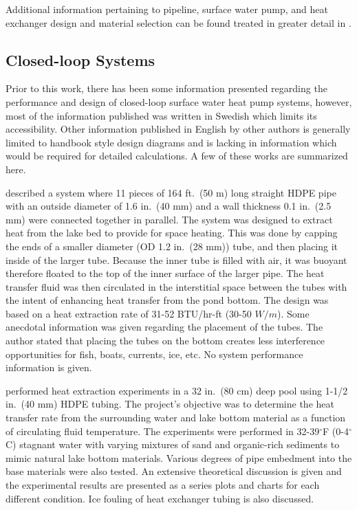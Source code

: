 Additional information pertaining to pipeline, surface water pump, and heat exchanger design and material selection can be found treated in greater detail in  \cite{MitchellSpitler2013}.

	\subsection{Closed-loop Systems}
	\label{subsec:Intro:LitRev:ClosedLoop}
	
Prior to this work, there has been some information presented regarding the performance and design of closed-loop surface water heat pump systems, however, most of the information published was written in Swedish which limits its accessibility. Other information published in English by other authors is generally limited to handbook style design diagrams and is lacking in information which would be required for detailed calculations. A few of these works are summarized here. 
	
\cite{Backlund1982} described a system where 11 pieces of 164 ft.\ (50 m) long straight HDPE pipe with  an outside diameter of 1.6 in.\ (40 mm) and a wall thickness 0.1 in.\ (2.5 mm) were connected together in parallel. The system was designed to extract heat from the lake bed to provide for space heating. This was done by capping the ends of a smaller diameter (OD 1.2 in.\ (28 mm)) tube, and then placing it inside of the larger tube. Because the inner tube is filled with air, it was buoyant therefore floated to the top of the inner surface of the larger pipe. The heat transfer fluid was then circulated in the interstitial space between the tubes with the intent of enhancing heat transfer from the pond bottom. The design was based on a heat extraction rate of 31-52 BTU/hr-ft (30-50 $W/m$). Some anecdotal information was given regarding the placement of the tubes. The author stated that placing the tubes on the bottom creates less interference opportunities for fish, boats, currents, ice, etc. No system performance information is given.

\cite{SvenssonSorman1982} performed heat extraction experiments in a 32 in.\ (80 cm) deep pool using 1-1/2 in.\ (40 mm) HDPE tubing. The project's objective was to determine the heat transfer rate from the surrounding water and lake bottom material as a function of circulating fluid temperature. The experiments were performed in 32-39$^\circ$F (0-4$^\circ$C) stagnant water with varying mixtures of sand and organic-rich sediments to mimic natural lake bottom materials. Various degrees of pipe embedment into the base materials were also tested. An extensive theoretical discussion is given and the experimental results are presented as a series plots and charts for each different condition. Ice fouling of heat exchanger tubing is also discussed.

